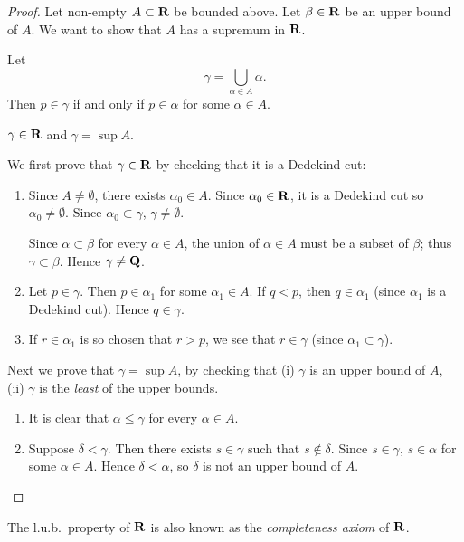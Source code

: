 \begin{proof}
Let non-empty $A\subset\mathbf R$ be bounded above. Let $\beta\in\mathbf R$ be an upper bound of $A$. We want to show that $A$ has a supremum in $\mathbf R$.

Let
\[\gamma=\bigcup_{\alpha\in A}\alpha.\]
Then $p\in\gamma$ if and only if $p\in\alpha$ for some $\alpha\in A$.

\begin{claim}
$\gamma\in\mathbf R$ and $\gamma=\sup A$.
\end{claim}

We first prove that $\gamma\in\mathbf R$ by checking that it is a Dedekind cut:
\begin{enumerate}[label=(\roman*)]
\item Since $A\neq\emptyset$, there exists $\alpha_0\in A$. Since $\alpha_0\in\mathbf R$, it is a Dedekind cut so $\alpha_0\neq\emptyset$. Since $\alpha_0\subset\gamma$, $\gamma\neq\emptyset$.

Since $\alpha\subset\beta$ for every $\alpha\in A$, the union of $\alpha\in A$ must be a subset of $\beta$; thus $\gamma\subset\beta$. Hence $\gamma\neq\mathbf Q$.

\item Let $p\in\gamma$. Then $p\in\alpha_1$ for some $\alpha_1\in A$. If $q<p$, then $q\in\alpha_1$ (since $\alpha_1$ is a Dedekind cut). Hence $q\in\gamma$.

\item If $r\in\alpha_1$ is so chosen that $r>p$, we see that $r\in\gamma$ (since $\alpha_1\subset\gamma$).
\end{enumerate}

Next we prove that $\gamma=\sup A$, by checking that (i) $\gamma$ is an upper bound of $A$, (ii) $\gamma$ is the \emph{least} of the upper bounds.
\begin{enumerate}[label=(\roman*)]
\item It is clear that $\alpha\le\gamma$ for every $\alpha\in A$.
\item Suppose $\delta<\gamma$. Then there exists $s\in\gamma$ such that $s\notin\delta$. Since $s\in\gamma$, $s\in\alpha$ for some $\alpha\in A$. Hence $\delta<\alpha$, so $\delta$ is not an upper bound of $A$.
\end{enumerate}
\end{proof}

\begin{remark}
The l.u.b.\ property of $\mathbf R$ is also known as the \emph{completeness axiom} of $\mathbf R$.
\end{remark}

